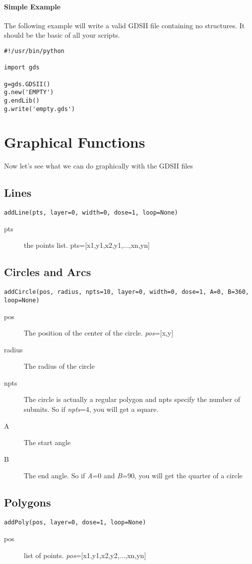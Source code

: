 \documentclass{article}
\newcommand{\var}[1]{\textit{#1}}
\begin{document}
\paragraph{Simple Example}
The following example will write a valid GDSII file containing no structures. It should be the basic of all your scripts.
\begin{lstlisting}[frame=single]
#!/usr/bin/python

import gds

g=gds.GDSII()
g.new('EMPTY')
g.endLib()
g.write('empty.gds')
\end{lstlisting}

\section{Graphical Functions}
Now let's see what we can do graphically with the GDSII files
\subsection{Lines}
\verb?addLine(pts, layer=0, width=0, dose=1, loop=None)?
\begin{description}
\item[pts] the points list. pts=[x1,y1,x2,y1,...,xn,yn]
\end{description}

\subsection{Circles and Arcs}
\verb?addCircle(pos, radius, npts=10, layer=0, width=0, dose=1, A=0, B=360, loop=None)?
\begin{description}
\item[pos] The position of the center of the circle. \var{pos}=[x,y]
\item[radius] The radius of the circle
\item[npts] The circle is actually a regular polygon and npts specify the number of submits. So if \var{npts}=4, you will get a square.
\item[A] The start angle
\item[B] The end angle. So if \var{A}=0 and \var{B}=90, you will get the quarter of a circle
\end{description}

\subsection{Polygons}
\verb?addPoly(pos, layer=0, dose=1, loop=None)?
\begin{description}
\item[pos] list of points. \var{pos}=[x1,y1,x2,y2,...,xn,yn]
\end{description}
\end{document}
